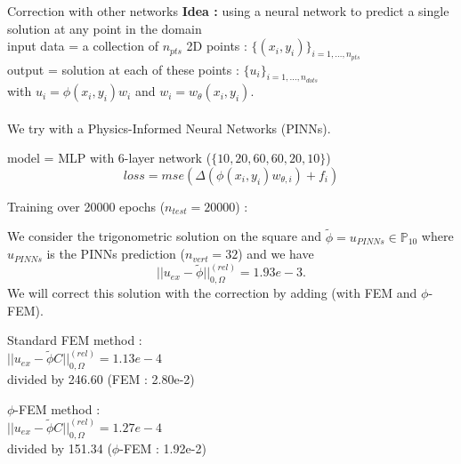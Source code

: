 \documentclass[compress,10pt,xcolor={table,dvipsnames},t]{beamer}
\begin{document}
	\begin{frame}[allowframebreaks]{Correction with other networks}
		\textbf{Idea :} using a neural network to predict a single solution at any point in the domain \\
		\quad input data = a collection of $n_{pts}$ 2D points : $\{(x_i,y_i)\}_{i=1,\dots, n_{pts}}$ \\
		\quad output = solution at each of these points : $\{u_i\}_{i=1,\dots,n_{dots}}$ \\
		\quad \quad with $u_i=\phi(x_i,y_i)w_i$ and $w_i=w_\theta(x_i,y_i)$. \\ \; \\
		
		We try with a Physics-Informed Neural Networks (PINNs).
		
		\begin{minipage}{0.48\linewidth}
			model = MLP with 6-layer network ($\{10,20,60,60,20,10\}$)
			\centering
			$$loss = mse(\Delta (\phi(x_i,y_i)w_{\theta,i})+f_i)$$
		\end{minipage}
		\begin{minipage}{0.48\linewidth}
			Training over 20000 epochs ($n_{test}=20000$) :
			\centering
		\end{minipage}
		
		\newpage
		
		We consider the trigonometric solution on the square and $\tilde{\phi}=u_{PINNs}\in\mathbb{P}_{10}$ where $u_{PINNs}$ is the PINNs prediction ($n_{vert}=32$) and we have 
		\begin{equation*}
			||u_{ex}-\tilde{\phi}||_{0,\Omega}^{(rel)}=1.93e-3.
		\end{equation*}
		We will correct this solution with the correction by adding (with FEM and $\phi$-FEM).
		
		\begin{minipage}{0.48\linewidth}
			Standard FEM method :
			\centering
			 \\
			$||u_{ex}-\tilde{\phi}C||_{0,\Omega}^{(rel)}=1.13e-4$ \\
			divided by 246.60 (FEM : 2.80e-2)
		\end{minipage}
		\begin{minipage}{0.48\linewidth}
			$\phi$-FEM method :
			\centering
			 \\
			$||u_{ex}-\tilde{\phi}C||_{0,\Omega}^{(rel)}=1.27e-4$ \\
			divided by 151.34 ($\phi$-FEM : 1.92e-2)
		\end{minipage}
		
	\end{frame}
	
\end{document}
